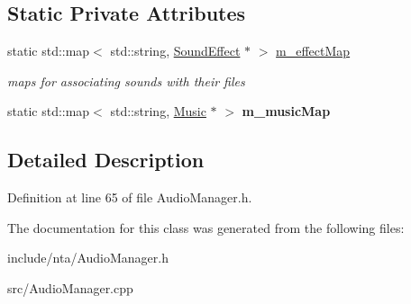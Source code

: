 \subsection*{Static Private Attributes}
\begin{DoxyCompactItemize}
\item 
\mbox{\label{classnta_1_1AudioManager_a745f3ef1216f7e6bf848a9eb4054c5b4}} 
static std\+::map$<$ std\+::string, \hyperlink{classnta_1_1SoundEffect}{Sound\+Effect} $\ast$ $>$ \hyperlink{classnta_1_1AudioManager_a745f3ef1216f7e6bf848a9eb4054c5b4}{m\+\_\+effect\+Map}
\begin{DoxyCompactList}\small\item\em maps for associating sounds with their files \end{DoxyCompactList}\item 
\mbox{\label{classnta_1_1AudioManager_ae301717a98c3a7bb0ca0b588c270b122}} 
static std\+::map$<$ std\+::string, \hyperlink{classnta_1_1Music}{Music} $\ast$ $>$ {\bfseries m\+\_\+music\+Map}
\end{DoxyCompactItemize}


\subsection{Detailed Description}


Definition at line 65 of file Audio\+Manager.\+h.



The documentation for this class was generated from the following files\+:\begin{DoxyCompactItemize}
\item 
include/nta/Audio\+Manager.\+h\item 
src/Audio\+Manager.\+cpp\end{DoxyCompactItemize}
